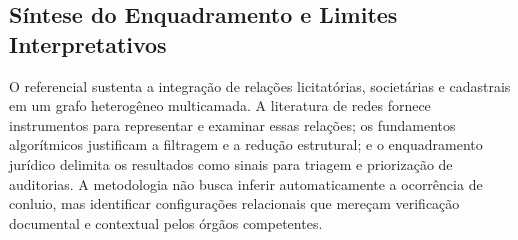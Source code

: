 \subsection{Síntese do Enquadramento e Limites Interpretativos}

O referencial sustenta a integração de relações licitatórias, societárias e cadastrais em um grafo heterogêneo multicamada. A literatura de redes fornece instrumentos para representar e examinar essas relações; os fundamentos algorítmicos justificam a filtragem e a redução estrutural; e o enquadramento jurídico delimita os resultados como sinais para triagem e priorização de auditorias. A metodologia não busca inferir automaticamente a ocorrência de conluio, mas identificar configurações relacionais que mereçam verificação documental e contextual pelos órgãos competentes.